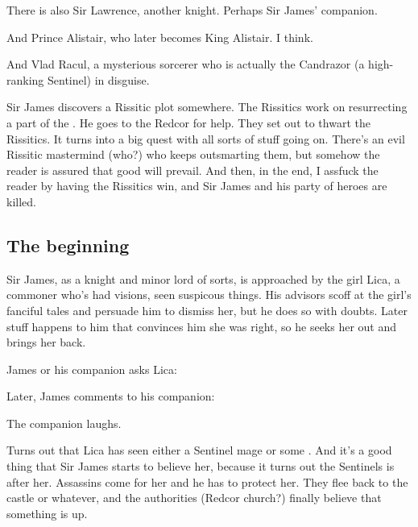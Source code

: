 There is also Sir Lawrence, another knight. 
Perhaps Sir James' companion. 

And Prince Alistair, who later becomes King Alistair. 
I think. 

And Vlad Racul, a mysterious sorcerer who is actually the \dragon{} Candrazor (a high-ranking Sentinel) in disguise. 

Sir James discovers a Rissitic plot somewhere. 
The Rissitics work on resurrecting a part of the \Haskelek{} \daemon. 
He goes to the Redcor for help. They set out to thwart the Rissitics. 
It turns into a big quest with all sorts of stuff going on. 
There's an evil Rissitic mastermind (who?) who keeps outsmarting them, but somehow the reader is assured that good will prevail. 
And then, in the end, I assfuck the reader by having the Rissitics win, and Sir James and his party of heroes are killed. 




\subsection{The beginning}
Sir James, as a knight and minor lord of sorts, is approached by the girl Lica, a commoner who's had visions, seen suspicous things. 
His advisors scoff at the girl's fanciful tales and persuade him to dismiss her, but he does so with doubts. 
Later stuff happens to him that convinces him she was right, so he seeks her out and brings her back. 

James or his companion asks Lica: 


Later, James comments to his companion: 

The companion laughs. 

Turns out that Lica has seen either a Sentinel mage or some \daemon. 
And it's a good thing that Sir James starts to believe her, because it turns out the Sentinels is after her. Assassins come for her and he has to protect her. They flee back to the castle or whatever, and the authorities (Redcor church?) finally believe that something is up. 

